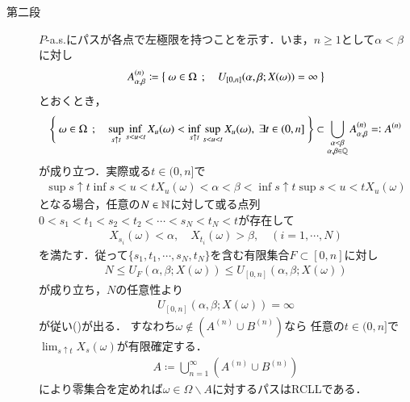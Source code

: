 \begin{prf}
\begin{description}
			\item[第二段]
				$P$-a.s.にパスが各点で左極限を持つことを示す．いま，$n \geq 1$として$\alpha < \beta$に対し
				\begin{align}
					A^{(n)}_{\alpha,\beta}
					\coloneqq \left\{\ \omega \in \Omega\ \, ; \quad U_{[0,n]}(\alpha,\beta;X(\omega)) = \infty\ \right\}
				\end{align}
				とおくとき，
				\begin{align}
					\left\{\ \omega \in \Omega\ \, ; \quad \operatorname*{sup}_{s \uparrow t} \operatorname*{inf}_{s < u < t} X_u(\omega)
					< \operatorname*{inf}_{s \uparrow t} \operatorname*{sup}_{s < u < t} X_u(\omega),\ \exists t \in (0,n]\ \right\}
					\subset \bigcup_{\substack{\alpha < \beta \\ \alpha,\beta \in \mathbb{Q}}}A^{(n)}_{\alpha,\beta}
					=\mathrel{\mathop:} A^{(n)}
					\label{eq:chapter_1_Theorem_3_8_v_1}
				\end{align}
				が成り立つ．実際或る$t \in (0,n]$で
				\begin{align}
					\sup{s \uparrow t}{}\inf{s < u < t}{X_u(\omega)}
					< \alpha < \beta < \inf{s \uparrow t}{}\sup{s < u < t}{X_u(\omega)}
				\end{align}
				となる場合，任意の$N \in \mathbb{N}$に対して或る点列
				$0 < s_1 < t_1 < s_2 < t_2 < \cdots < s_N < t_N < t$が存在して
				\begin{align}
					X_{s_i}(\omega) < \alpha,
					\quad X_{t_i}(\omega) > \beta,
					\quad (i=1,\cdots,N)
				\end{align}
				を満たす．従って$\{s_1,t_1,\cdots,s_N,t_N\}$を含む有限集合$F \subset [0,n]$に対し
				\begin{align}
					N \leq U_F(\alpha,\beta;X(\omega)) \leq U_{[0,n]}(\alpha,\beta;X(\omega))
				\end{align}
				が成り立ち，$N$の任意性より
				\begin{align}
					U_{[0,n]}(\alpha,\beta;X(\omega)) = \infty
				\end{align}
				が従い()が出る．
				すなわち$\omega \notin \left( A^{(n)} \cup B^{(n)} \right)$なら
				任意の$t \in (0,n]$で$\lim_{s \uparrow t} X_s(\omega)$が有限確定する．
				\begin{align}
					A \coloneqq \bigcup_{n=1}^\infty \left( A^{(n)} \cup B^{(n)} \right)
				\end{align}
				により零集合を定めれば$\omega \in \Omega \backslash A$に対するパスはRCLLである．
				\QED
		\end{description}
	\end{prf}
	
